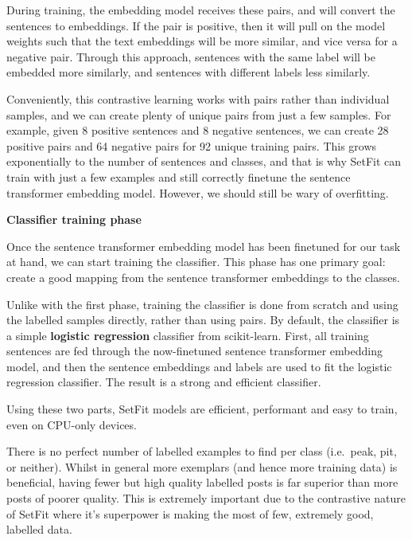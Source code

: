 \documentclass[
  letterpaper,
  DIV=11,
  numbers=noendperiod]{scrreprt}
\begin{document}
\begin{tcolorbox}
During training, the embedding model receives these pairs, and will
convert the sentences to embeddings. If the pair is positive, then it
will pull on the model weights such that the text embeddings will be
more similar, and vice versa for a negative pair. Through this approach,
sentences with the same label will be embedded more similarly, and
sentences with different labels less similarly.

Conveniently, this contrastive learning works with pairs rather than
individual samples, and we can create plenty of unique pairs from just a
few samples. For example, given 8 positive sentences and 8 negative
sentences, we can create 28 positive pairs and 64 negative pairs for 92
unique training pairs. This grows exponentially to the number of
sentences and classes, and that is why SetFit can train with just a few
examples and still correctly finetune the sentence transformer embedding
model. However, we should still be wary of overfitting.

\textbf{Classifier training phase}

Once the sentence transformer embedding model has been finetuned for our
task at hand, we can start training the classifier. This phase has one
primary goal: create a good mapping from the sentence transformer
embeddings to the classes.

Unlike with the first phase, training the classifier is done from
scratch and using the labelled samples directly, rather than using
pairs. By default, the classifier is a simple \textbf{logistic
regression} classifier from scikit-learn. First, all training sentences
are fed through the now-finetuned sentence transformer embedding model,
and then the sentence embeddings and labels are used to fit the logistic
regression classifier. The result is a strong and efficient classifier.

Using these two parts, SetFit models are efficient, performant and easy
to train, even on CPU-only devices.

\end{tcolorbox}

There is no perfect number of labelled examples to find per class
(i.e.~peak, pit, or neither). Whilst in general more exemplars (and
hence more training data) is beneficial, having fewer but high quality
labelled posts is far superior than more posts of poorer quality. This
is extremely important due to the contrastive nature of SetFit where
it's superpower is making the most of few, extremely good, labelled
data.
\end{document}

